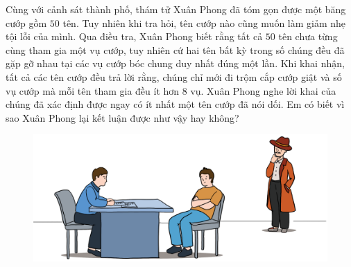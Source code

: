 \centering
\endgroup
\vspace*{25pt} 
\begin{multicols}{2}
	Cùng với cảnh sát thành phố, thám tử Xuân Phong đã tóm gọn được một băng cướp gồm $50$ tên. Tuy nhiên khi tra hỏi, tên cướp nào cũng muốn làm giảm nhẹ tội lỗi của mình. Qua điều tra, Xuân Phong biết rằng tất cả $50$ tên chưa từng cùng tham gia một vụ cướp, tuy nhiên cứ hai tên bất kỳ trong số chúng đều đã gặp gỡ nhau tại các vụ cướp bóc chung duy nhất đúng một lần. Khi khai nhận, tất cả các tên cướp đều trả lời rằng, chúng chỉ mới đi trộm cắp cướp giật và số vụ cướp mà mỗi tên tham gia đều ít hơn $8$ vụ. Xuân Phong nghe lời khai của chúng đã xác định được ngay có ít nhất một tên cướp đã nói dối. Em có biết vì sao Xuân Phong lại kết luận được như vậy hay không?
\end{multicols}
\begin{figure}[H]
	\centering
	\vspace*{-15pt}
	\captionsetup{labelformat= empty, justification=centering}
	\includegraphics[width=0.85\linewidth]{xp}
	\vspace*{-10pt}
\end{figure}
